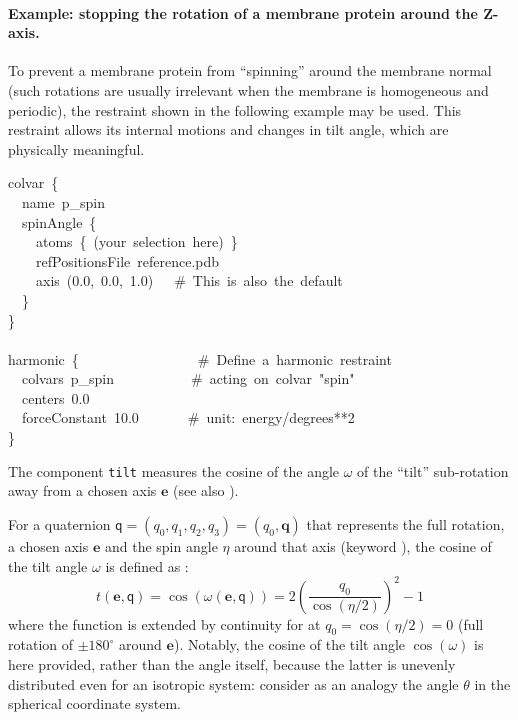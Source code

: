 \paragraph*{Example: stopping the rotation of a membrane protein around the Z-axis.}  To prevent a membrane protein from ``spinning'' around the membrane normal (such rotations are usually irrelevant when the membrane is homogeneous and periodic), the restraint shown in the following example may be used.
This restraint allows its internal motions and changes in tilt angle, which are physically meaningful.

\begin{cvexampleinput}
\-colvar~\{\\
\-~~name~p\_spin\\
\-~~spinAngle~\{\\
\-~~~~atoms~\{~(your~selection~here)~\}\\
\-~~~~refPositionsFile~reference.pdb\\
\-~~~~axis~(0.0,~0.0,~1.0)~~~\#~This~is~also~the~default\\
\-~~\}\\
\-\}\\
\-\\
\-harmonic~\{~~~~~~~~~~~~~~~~~\#~Define~a~harmonic~restraint\\
\-~~colvars~p\_spin~~~~~~~~~~~\#~acting~on~colvar~"spin"\\
\-~~centers~0.0\\
\-~~forceConstant~10.0~~~~~~~\#~unit:~energy/degrees**2\\
\-\}\\
\end{cvexampleinput}



The component \texttt{tilt} measures the cosine of the angle $\omega$ of the ``tilt'' sub-rotation away from a chosen axis $\mathbf{e}$ (see also ).

For a quaternion $\mathsf{q} = (q_0, q_1, q_2, q_3) = (q_0, \mathbf{q})$ that represents the full rotation, a chosen axis $\mathbf{e}$ and the spin angle $\eta$ around that axis (keyword ), the cosine of the tilt angle $\omega$ is defined as \cite{Daniilidis1999,Hu2006}:
\begin{equation}
  \label{eq:cvc_tilt}
  t\left(\mathbf{e}, \mathsf{q}\right) = \cos\left(\omega\left(\mathbf{e}, \mathsf{q}\right)\right) = 2 \left(\dfrac{q_0}{\cos\left(\eta/2\right)}\right)^2 - 1
\end{equation}
where the function is extended by continuity for at $q_0 = \cos\left(\eta/2\right) = 0$ (full rotation of $\pm 180^{\circ}$ around $\mathbf{e}$).
Notably, the cosine of the tilt angle $\cos\left(\omega\right)$ is here provided, rather than the angle itself, because the latter is unevenly distributed even for an isotropic system: consider as an analogy the angle $\theta$ in the spherical coordinate system.


